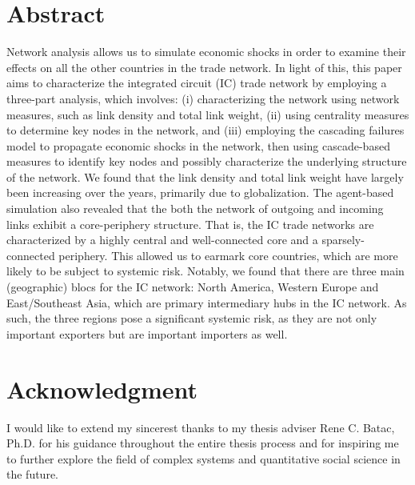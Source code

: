 \documentclass[12pt,letterpaper]{report}
\begin{document}
\section*{\centering Abstract}
	\noindent
	 Network analysis allows us to simulate economic shocks in order to examine their effects on all the other countries in the trade network. In light of this, this paper aims to characterize the integrated circuit (IC) trade network by employing a three-part analysis, which involves: (i) characterizing the network using network measures, such as link density and total link weight, (ii) using centrality measures to determine key nodes in the network, and (iii) employing the cascading failures model to propagate economic shocks in the network, then using cascade-based measures to identify key nodes and possibly characterize the underlying structure of the network. We found that the link density and total link weight have largely been increasing over the years, primarily due to globalization. The agent-based simulation also revealed that the both the network of outgoing and incoming links exhibit a core-periphery structure. That is, the IC trade networks are characterized by a highly central and well-connected core and a sparsely-connected periphery. This allowed us to earmark core countries, which are more likely to be subject to systemic risk. Notably, we found that there are three main (geographic) blocs for the IC network: North America, Western Europe and East/Southeast Asia, which are primary intermediary hubs in the IC network. As such, the three regions pose a significant systemic risk, as they are not only important exporters but are important importers as well. 


\section*{\centering Acknowledgment}
\noindent I would like to extend my sincerest thanks to my thesis adviser Rene C. Batac, Ph.D. for his guidance throughout the entire thesis process and for inspiring me to further explore the field of complex systems and quantitative social science in the future.

\pagebreak

\tableofcontents
\pagebreak
 
\listoffigures
\pagebreak

\listoftables
\pagebreak
\end{document}
